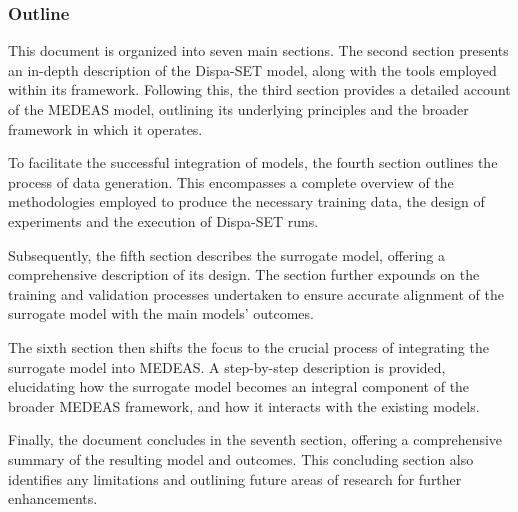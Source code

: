 \subsubsection{Outline}

This document is organized into seven main sections. The second section presents an in-depth description of the Dispa-SET model, along with the tools employed within its framework. Following this, the third section provides a detailed account of the MEDEAS model, outlining its underlying principles and the broader framework in which it operates.

To facilitate the successful integration of models, the fourth section outlines the process of data generation. This encompasses a complete overview of the methodologies employed to produce the necessary training data, the design of experiments and the execution of Dispa-SET runs.

Subsequently, the fifth section describes the surrogate model, offering a comprehensive description of its design. The section further expounds on the training and validation processes undertaken to ensure accurate alignment of the surrogate model with the main models' outcomes.

The sixth section then shifts the focus to the crucial process of integrating the surrogate model into MEDEAS. A step-by-step description is provided, elucidating how the surrogate model becomes an integral component of the broader MEDEAS framework, and how it interacts with the existing models.

Finally, the document concludes in the seventh section, offering a comprehensive summary of the resulting model and outcomes. This concluding section also identifies any limitations and outlining future areas of research for further enhancements. 


